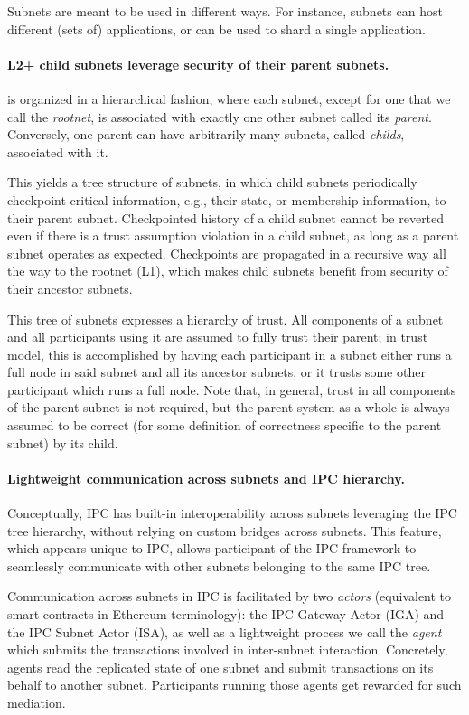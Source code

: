 Subnets are meant to be used in different ways. For instance, subnets can host different (sets of) applications, or can be used to shard a single application.

\paragraph{L2+ child subnets leverage security of their parent subnets.} \ipc is organized in a hierarchical fashion, where each subnet, except for one that we call the \emph{\gls{rootnet}}, is associated with exactly one other subnet called its \emph{\gls{parent}}.
Conversely, one parent can have arbitrarily many subnets, called \emph{\glspl{child}}, associated with it.

This yields a tree structure of subnets, in which child subnets periodically \gls{checkpoint} critical information, e.g., their \gls{state}, or \gls{membership} information, to their parent subnet. Checkpointed history of a child subnet cannot be reverted even if there is a trust assumption violation in a child subnet, as long as a parent subnet operates as expected. Checkpoints are propagated in a recursive way all the way to the rootnet (L1), which makes child subnets benefit from security of their ancestor subnets. 

This tree of subnets expresses a hierarchy of trust.
All components of a subnet and all \glspl{participant} using it are assumed to fully trust their parent; in \ipc trust model, this is accomplished by having each participant in a subnet either runs a \gls{full node} in said subnet and all its ancestor subnets, or it trusts some other participant which runs a full node. 
Note that, in general, trust in all components of the parent subnet is not required, but the parent system as a whole is always assumed to be correct (for some definition of correctness specific to the parent subnet) by its child.

\paragraph{Lightweight communication across subnets and IPC hierarchy.}
Conceptually, IPC has built-in interoperability across subnets leveraging the IPC tree hierarchy, without relying on custom bridges across subnets.
This feature, which appears unique to IPC, allows \gls{participant} of the IPC framework to seamlessly communicate with other subnets belonging to the same IPC tree. 

Communication across subnets in IPC is facilitated by two \emph{\glspl{actor}} (equivalent to smart-contracts in Ethereum terminology):
the IPC Gateway Actor (IGA) and the IPC Subnet Actor (ISA), as well as a lightweight process we call the \emph{\ipc agent} which submits the transactions involved in inter-subnet interaction. Concretely, \ipc agents read the replicated state of one subnet and submit transactions on its behalf to another subnet.
Participants running those \ipc agents get rewarded for such mediation. 

